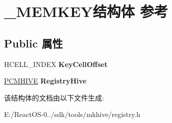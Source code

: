 \hypertarget{struct___m_e_m_k_e_y}{}\section{\+\_\+\+M\+E\+M\+K\+E\+Y结构体 参考}
\label{struct___m_e_m_k_e_y}
\subsection*{Public 属性}
\begin{DoxyCompactItemize}
\item 
\mbox{\label{struct___m_e_m_k_e_y_acae5ea4ae09a331212a1e48dc4510bb3}} 
H\+C\+E\+L\+L\+\_\+\+I\+N\+D\+EX {\bfseries Key\+Cell\+Offset}
\item 
\mbox{\label{struct___m_e_m_k_e_y_ad61fe8181b8efa51729926aaae74afcd}} 
\hyperlink{struct___c_m_h_i_v_e}{P\+C\+M\+H\+I\+VE} {\bfseries Registry\+Hive}
\end{DoxyCompactItemize}


该结构体的文档由以下文件生成\+:\begin{DoxyCompactItemize}
\item 
E\+:/\+React\+O\+S-\/0../sdk/tools/mkhive/registry.\+h\end{DoxyCompactItemize}
